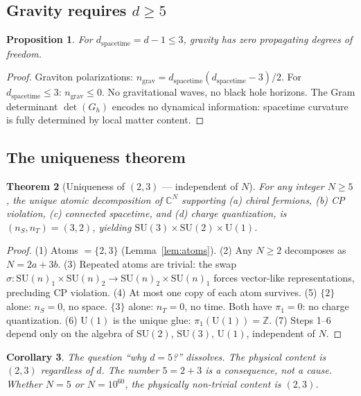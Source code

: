 \documentclass[12pt]{article}
\newtheorem{theorem}{Theorem}[section]
\newtheorem{corollary}[theorem]{Corollary}
\newtheorem{proposition}[theorem]{Proposition}
\theoremstyle{remark}
\theoremstyle{definition}
\newcommand{\CC}{\mathbb{C}}
\begin{document}
\subsection{Gravity requires $d \geq 5$}

\begin{proposition}
For $d_\text{spacetime} = d - 1 \leq 3$, gravity has zero propagating degrees of freedom.
\end{proposition}

\begin{proof}
Graviton polarizations: $n_\text{grav} = d_\text{spacetime}(d_\text{spacetime} - 3)/2$. For $d_\text{spacetime} \leq 3$: $n_\text{grav} \leq 0$. No gravitational waves, no black hole horizons. The Gram determinant $\det(G_h)$ encodes no dynamical information: spacetime curvature is fully determined by local matter content.
\end{proof}

\subsection{The uniqueness theorem}

\begin{theorem}[Uniqueness of $(2,3)$ --- independent of $N$]
\label{thm:d5}
For any integer $N \geq 5$, the unique atomic decomposition of $\CC^N$ supporting (a) chiral fermions, (b) CP violation, (c) connected spacetime, and (d) charge quantization, is $(n_S, n_T) = (3, 2)$, yielding $\text{SU}(3) \times \text{SU}(2) \times \text{U}(1)$.
\end{theorem}

\begin{proof}
(1) Atoms $= \{2, 3\}$ (Lemma~\ref{lem:atoms}). (2) Any $N \geq 2$ decomposes as $N = 2a + 3b$. (3) Repeated atoms are trivial: the swap $\sigma: \text{SU}(n)_1 \times \text{SU}(n)_2 \to \text{SU}(n)_2 \times \text{SU}(n)_1$ forces vector-like representations, precluding CP violation. (4) At most one copy of each atom survives. (5) $\{2\}$ alone: $n_S = 0$, no space. $\{3\}$ alone: $n_T = 0$, no time. Both have $\pi_1 = 0$: no charge quantization. (6) $\text{U}(1)$ is the unique glue: $\pi_1(\text{U}(1)) = \mathbb{Z}$. (7) Steps 1--6 depend only on the algebra of $\text{SU}(2)$, $\text{SU}(3)$, $\text{U}(1)$, independent of $N$.
\end{proof}

\begin{corollary}
The question ``why $d = 5$?'' dissolves. The physical content is $(2, 3)$ regardless of $d$. The number $5 = 2 + 3$ is a consequence, not a cause. Whether $N = 5$ or $N = 10^{60}$, the physically non-trivial content is $(2, 3)$.
\end{corollary}
\end{document}
